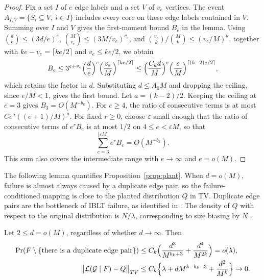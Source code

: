 \begin{proof}
Fix a set $I$ of $e$ edge labels and a set $V$ of $v_e$ vertices. The event $A_{I,V}=\{S_i\subseteq V,\ i\in I\}$ includes every core on these edge labels contained in $V$. Summing over $I$ and $V$ gives the first-moment bound $B_e$ in the lemma. Using $\binom de\le(3d/e)^e$, $\binom M{v_e}\le(3M/v_e)^{v_e}$, and $\binom{v_e}k/\binom Mk\le(v_e/M)^k$, together with $ke-v_e=\lceil ke/2\rceil$ and $v_e\le ke/2$, we obtain
\[
B_e\le3^{e+v_e}\Bigl(\frac de\Bigr)^e\Bigl(\frac{v_e}M\Bigr)^{\lceil ke/2\rceil}\le\Bigl(\frac{C_kd}M\Bigr)^e\Bigl(\frac eM\Bigr)^{\lceil(k-2)e/2\rceil},
\]
which retains the factor in $d$. Substituting $d\le A_0M$ and dropping the ceiling, since $e/M<1$, gives the first bound. Let $a=(k-2)/2$. Keeping the ceiling at $e=3$ gives $B_3=O(M^{-b_k})$. For $e\ge4$, the ratio of consecutive terms is at most $Ce^a((e+1)/M)^a$. For fixed $r\ge0$, choose $\varepsilon$ small enough that the ratio of consecutive terms of $e^rB_e$ is at most $1/2$ on $4\le e<\varepsilon M$, so that
\[
\sum_{e=3}^{\lfloor\varepsilon M\rfloor}e^rB_e=O(M^{-b_k}).
\]
This sum also covers the intermediate range with $e\to\infty$ and $e=o(M)$.
\end{proof}


The following lemma quantifies Proposition~\ref{prop:plant}. When $d=o(M)$, failure is almost always caused by a duplicate edge pair, so the failure-conditioned mapping is close to the planted distribution $Q$ in TV. Duplicate edge pairs are the bottleneck of IBLT failure, as identified in \cite{gm}. The density of $Q$ with respect to the original distribution is $N/\lambda$, corresponding to size biasing by $N$ \cite{arratia2019sizebias}.

\begin{lemma}[Failure is determined by a duplicate edge pair when $d=o(M)$]\label{lem:plant}
Let $2\le d=o(M)$, regardless of whether $d\to\infty$. Then
\begin{align*}
\Pr(F\setminus\{\text{there is a duplicate edge pair}\})&\le C_k\Bigl(\frac{d^3}{M^{b_k+3}}+\frac{d^4}{M^{2k}}\Bigr)=o(\lambda),\\
\bigl\|\mathcal L(\mathcal G\mid F)-Q\bigr\|_{TV}&\le C_k\Bigl\{\lambda+dM^{k-b_k-3}+\frac{d^2}{M^k}\Bigr\}\to0.
\end{align*}
\end{lemma}

